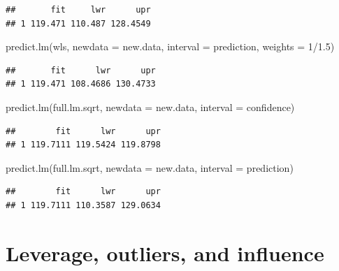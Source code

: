 \documentclass[
]{book}
\newenvironment{Shaded}{\begin{snugshade}}{\end{snugshade}}
\newcommand{\AttributeTok}[1]{\textcolor[rgb]{0.77,0.63,0.00}{#1}}
\newcommand{\DecValTok}[1]{\textcolor[rgb]{0.00,0.00,0.81}{#1}}
\newcommand{\FloatTok}[1]{\textcolor[rgb]{0.00,0.00,0.81}{#1}}
\newcommand{\FunctionTok}[1]{\textcolor[rgb]{0.00,0.00,0.00}{#1}}
\newcommand{\NormalTok}[1]{#1}
\newcommand{\SpecialCharTok}[1]{\textcolor[rgb]{0.00,0.00,0.00}{#1}}
\newcommand{\StringTok}[1]{\textcolor[rgb]{0.31,0.60,0.02}{#1}}
\begin{document}
\begin{verbatim}
##       fit     lwr      upr
## 1 119.471 110.487 128.4549
\end{verbatim}

\begin{Shaded}
\begin{Highlighting}[]
\FunctionTok{predict.lm}\NormalTok{(wls, }\AttributeTok{newdata =}\NormalTok{ new.data, }\AttributeTok{interval =} \StringTok{\textquotesingle{}prediction\textquotesingle{}}\NormalTok{, }\AttributeTok{weights =} \DecValTok{1}\SpecialCharTok{/}\FloatTok{1.5}\NormalTok{)}
\end{Highlighting}
\end{Shaded}

\begin{verbatim}
##       fit      lwr      upr
## 1 119.471 108.4686 130.4733
\end{verbatim}

\begin{Shaded}
\begin{Highlighting}[]
\FunctionTok{predict.lm}\NormalTok{(full.lm.sqrt, }\AttributeTok{newdata =}\NormalTok{ new.data, }\AttributeTok{interval =} \StringTok{\textquotesingle{}confidence\textquotesingle{}}\NormalTok{)}
\end{Highlighting}
\end{Shaded}

\begin{verbatim}
##        fit      lwr      upr
## 1 119.7111 119.5424 119.8798
\end{verbatim}

\begin{Shaded}
\begin{Highlighting}[]
\FunctionTok{predict.lm}\NormalTok{(full.lm.sqrt, }\AttributeTok{newdata =}\NormalTok{ new.data, }\AttributeTok{interval =} \StringTok{\textquotesingle{}prediction\textquotesingle{}}\NormalTok{)}
\end{Highlighting}
\end{Shaded}

\begin{verbatim}
##        fit      lwr      upr
## 1 119.7111 110.3587 129.0634
\end{verbatim}

\hypertarget{leverage-outliers-and-influence}{%
\section{Leverage, outliers, and influence}\label{leverage-outliers-and-influence}}
\end{document}
